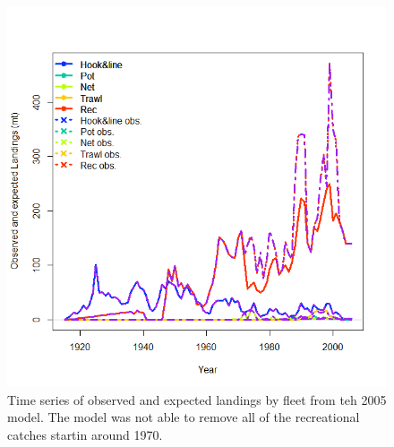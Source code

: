 \documentclass[12pt,]{article}
\begin{document}
\begin{figure}[htbp]
\centering
\includegraphics{Figures/bridge_catch.png}
\caption{Time series of observed and expected landings by fleet from teh
2005 model. The model was not able to remove all of the recreational
catches startin around 1970. \label{fig:bridge_catch}}
\end{figure}
\end{document}
